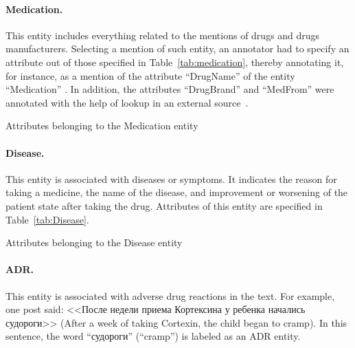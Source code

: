 \documentclass[a4paper,fleqn,longmktitle]{cas-dc}
\begin{document}
\paragraph{Medication.} This entity includes everything related to the mentions of drugs and drugs manufacturers. Selecting a mention of such entity, an annotator had to specify an attribute out of those specified in Table~\ref{tab:medication}, thereby annotating it, for instance, as a mention of the attribute ``DrugName'' of the entity ``Medication'' .
In addition, the attributes ``DrugBrand'' and ``MedFrom'' were annotated with the help of lookup in an external source~\cite{SRD}.

\begin{table*}
\caption{Attributes belonging to the Medication entity}
\label{tab:medication}

\end{table*}

\paragraph{Disease.} 
This entity is associated with diseases or symptoms. It indicates the reason for taking a medicine, the name of the disease, and improvement or worsening of the patient state after taking the drug. 
Attributes of this entity are specified in Table~\ref{tab:Disease}.

\begin{table*}
\caption{Attributes belonging to the Disease entity} 
\label{tab:Disease} 

\end{table*}

\paragraph{ADR.} This entity is associated with adverse drug reactions in the text. For example, one post said:
<<После недели приема Кортексина у ребенка начались судороги>> (After a week of taking Cortexin, the child began to cramp). In this sentence, the word ``судороги'' (``cramp'') is labeled as an ADR entity.
\end{document}
